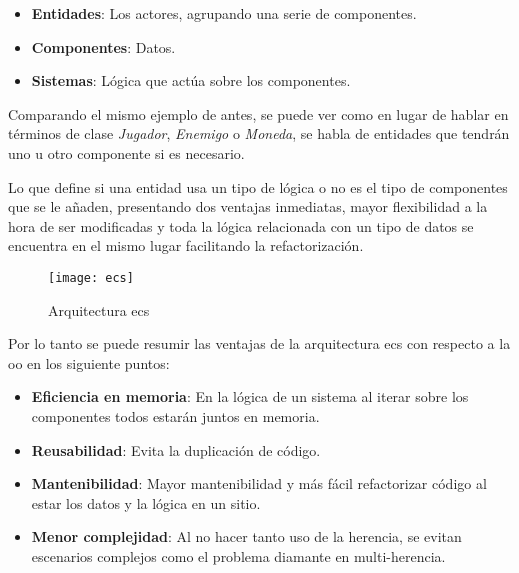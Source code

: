 \begin{itemize} 
	\item \textbf{Entidades}: Los actores, agrupando una serie de componentes. 
	\item \textbf{Componentes}: Datos.
	\item \textbf{Sistemas}: Lógica que actúa sobre los componentes.
\end{itemize}

Comparando el mismo ejemplo de antes, se puede ver como en lugar de hablar en términos de clase \textit{Jugador}, 
\textit{Enemigo} o \textit{Moneda}, se habla de entidades que tendrán uno u otro componente si es necesario.

Lo que define si una entidad usa un tipo de lógica o no es el tipo de componentes que se le añaden, presentando dos
ventajas inmediatas, mayor flexibilidad a la hora de ser modificadas y toda la lógica relacionada con un tipo de datos
se encuentra en el mismo lugar facilitando la refactorización.

\begin{figure}[!h]
	\centering
	\texttt{[image: ecs]}
	\caption{Arquitectura \gls{ecs}}
	\label{ecs-figure}
\end{figure}

\newpage

Por lo tanto se puede resumir las ventajas de la arquitectura \gls{ecs} con respecto a la \gls{oo} en los siguiente puntos:

\begin{itemize} 
	\item \textbf{Eficiencia en memoria}: En la lógica de un sistema al iterar sobre los componentes todos estarán juntos en memoria\cite{memory-friendly}.
	\item \textbf{Reusabilidad}: Evita la duplicación de código.
	\item \textbf{Mantenibilidad}: Mayor mantenibilidad y más fácil refactorizar código al estar los datos y la lógica en un sitio.
	\item \textbf{Menor complejidad}: Al no hacer tanto uso de la herencia, se evitan escenarios complejos como el problema
	 diamante en multi-herencia.
\end{itemize}
